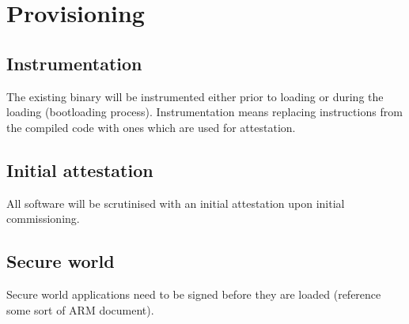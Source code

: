 \section{Provisioning}

\subsection{Instrumentation}

The existing binary will be instrumented either prior to loading or during the loading (bootloading process). Instrumentation means replacing instructions from the compiled code with ones which are used for attestation.

\subsection{Initial attestation}

All software will be scrutinised with an initial attestation upon initial commissioning.

\subsection{Secure world}

Secure world applications need to be signed before they are loaded (reference some sort of ARM document).

